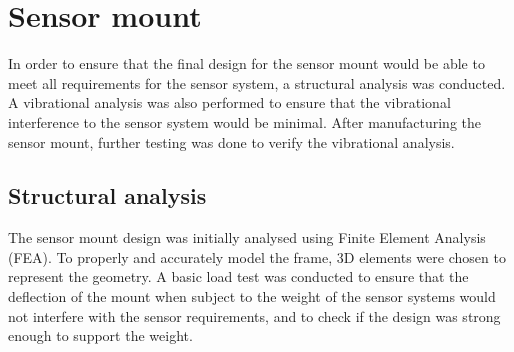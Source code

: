 \documentclass[main.tex]{subfiles}
\begin{document}
\section{Sensor mount}
In order to ensure that the final design for the sensor mount would be able to meet all requirements for the sensor system, a structural analysis was conducted. A vibrational analysis was also performed to ensure that the vibrational interference to the sensor system would be minimal. After manufacturing the sensor mount, further testing was done to verify the vibrational analysis.

\subsection{Structural analysis}
The sensor mount design was initially analysed using Finite Element Analysis (FEA).
To properly and accurately model the frame, 3D elements were chosen to represent the geometry. A basic load test was conducted to ensure that the deflection of the mount when subject to the weight of the sensor systems would not interfere with the sensor requirements, and to check if the design was strong enough to support the weight.
\end{document}
